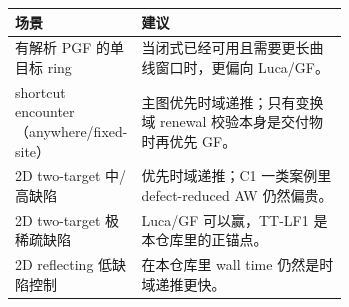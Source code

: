 \begin{tabular}{lp{0.66\linewidth}}
\toprule
场景 & 建议 \\
\midrule
有解析 PGF 的单目标 ring & 当闭式已经可用且需要更长曲线窗口时，更偏向 Luca/GF。 \\
shortcut encounter（anywhere/fixed-site） & 主图优先时域递推；只有变换域 renewal 校验本身是交付物时再优先 GF。 \\
2D two-target 中/高缺陷 & 优先时域递推；C1 一类案例里 defect-reduced AW 仍然偏贵。 \\
2D two-target 极稀疏缺陷 & Luca/GF 可以赢，TT-LF1 是本仓库里的正锚点。 \\
2D reflecting 低缺陷控制 & 在本仓库里 wall time 仍然是时域递推更快。 \\
\bottomrule
\end{tabular}
